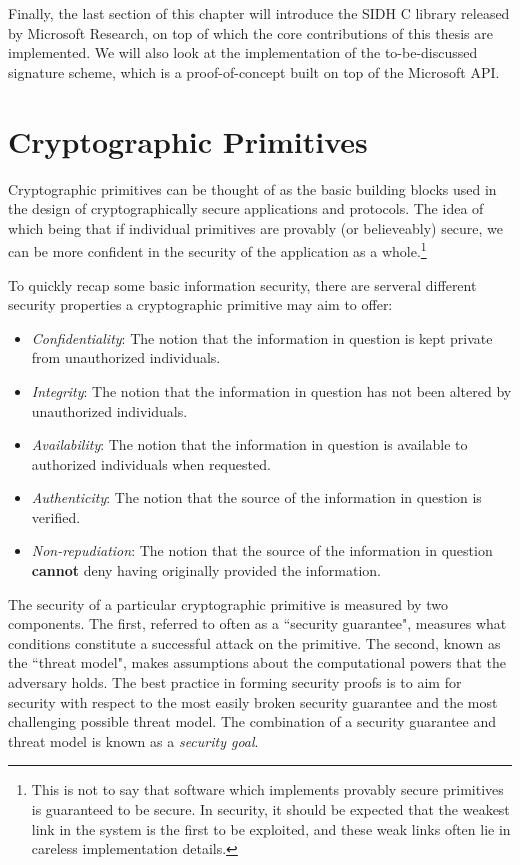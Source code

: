 Finally, the last section of this chapter will introduce the SIDH C library released by Microsoft Research, on top of which the core contributions of this thesis are implemented. We will also look at the implementation of the to-be-discussed signature scheme, which is a proof-of-concept built on top of the Microsoft API.\\


\section{Cryptographic Primitives}

Cryptographic primitives can be thought of as the basic building blocks used in the design of cryptographically secure applications and protocols. The idea of which being that if individual primitives are provably (or believeably) secure, we can be more confident in the security of the application as a whole.\footnote{This is not to say that software which implements provably secure primitives is guaranteed to be secure. In security, it should be expected that the weakest link in the system is the first to be exploited, and these weak links often lie in careless implementation details.}

To quickly recap some basic information security, there are serveral different security properties a cryptographic primitive may aim to offer:
\begin{itemize}
\item \emph{Confidentiality}:
The notion that the information in question is kept private from unauthorized individuals.
\item \emph{Integrity}:
The notion that the information in question has not been altered by unauthorized individuals.
\item \emph{Availability}:
The notion that the information in question is available to authorized individuals when requested.
\item \emph{Authenticity}:
The notion that the source of the information in question is verified.
\item \emph{Non-repudiation}:
The notion that the source of the information in question \textbf{cannot} deny having originally provided the information.
\end{itemize}

The security of a particular cryptographic primitive is measured by two components. The first, referred to often as a ``security guarantee", measures what conditions constitute a successful attack on the primitive. The second, known as the ``threat model", makes assumptions about the computational powers that the adversary holds. The best practice in forming security proofs is to aim for security with respect to the most easily broken security guarantee and the most challenging possible threat model. The combination of a security guarantee and threat model is known as a \emph{security goal}.

